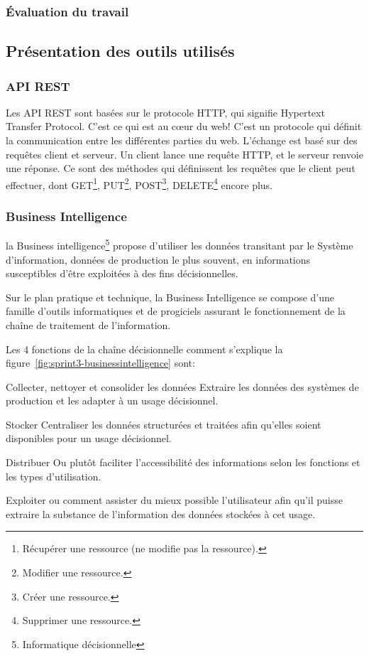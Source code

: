 \subsubsection{Évaluation du travail}
\subsection{Présentation des outils utilisés}
\subsubsection{API REST}
Les API REST sont basées sur le protocole HTTP, qui signifie Hypertext Transfer Protocol.
C’est ce qui est au cœur du web! C’est un protocole qui définit la communication
entre les différentes parties du web. L’échange est basé sur des requêtes client et serveur.
Un client lance une requête HTTP, et le serveur renvoie une réponse.
Ce sont des méthodes qui définissent les requêtes que le client peut effectuer,
dont GET\footnote{Récupérer une ressource (ne modifie pas la ressource).}, PUT\footnote{Modifier une ressource.},
POST\footnote{Créer une ressource.}, DELETE\footnote{Supprimer une ressource.} encore plus.

\subsubsection{Business Intelligence}

la Business intelligence\footnote{Informatique décisionnelle} propose d'utiliser
les données transitant par le Système
d'information, données de production le plus souvent, en informations susceptibles
d'être exploitées à des fins décisionnelles.

Sur le plan pratique et technique, la Business Intelligence se compose d'une famille
d'outils informatiques et
de progiciels assurant le fonctionnement de la chaîne de traitement de l'information.

Les 4 fonctions de la chaîne décisionnelle comment s'explique la figure~\ref{fig:sprint3-businessintelligence} sont:
\begin{description}[align=right,labelwidth=1cm]
 \item [1] Collecter, nettoyer et consolider les données Extraire les données
 des systèmes de production et les adapter à un usage décisionnel.
 \item [2] Stocker Centraliser les données structurées et traitées afin qu'elles
 soient disponibles pour un usage décisionnel.
 \item [3] Distribuer Ou plutôt faciliter l'accessibilité des informations selon
 les fonctions et les types d'utilisation.
 \item [4] Exploiter ou comment assister du mieux possible l'utilisateur afin qu'il puisse extraire
 la substance de l'information des données stockées à cet usage.
\end{description}

